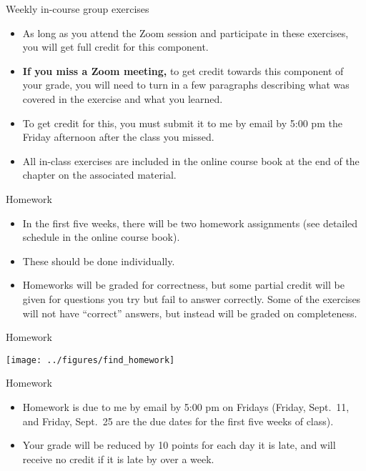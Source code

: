 \documentclass[
  10pt,
  ignorenonframetext,
]{beamer}
\providecommand{\tightlist}{%
  \setlength{\itemsep}{0pt}\setlength{\parskip}{0pt}}
\begin{document}
\begin{frame}{Weekly in-course group exercises}
\protect\hypertarget{weekly-in-course-group-exercises}{}

\begin{itemize}
\tightlist
\item
  As long as you attend the Zoom session and participate in these
  exercises, you will get full credit for this component.
\item
  \textbf{If you miss a Zoom meeting,} to get credit towards this
  component of your grade, you will need to turn in a few paragraphs
  describing what was covered in the exercise and what you learned.
\item
  To get credit for this, you must submit it to me by email by 5:00 pm
  the Friday afternoon after the class you missed.
\item
  All in-class exercises are included in the online course book at the
  end of the chapter on the associated material.
\end{itemize}

\end{frame}

\begin{frame}{Homework}
\protect\hypertarget{homework}{}

\begin{itemize}
\tightlist
\item
  In the first five weeks, there will be two homework assignments (see
  detailed schedule in the online course book).
\item
  These should be done individually.
\item
  Homeworks will be graded for correctness, but some partial credit will
  be given for questions you try but fail to answer correctly. Some of
  the exercises will not have ``correct'' answers, but instead will be
  graded on completeness.
\end{itemize}

\end{frame}

\begin{frame}{Homework}
\protect\hypertarget{homework-1}{}

\begin{center}\texttt{[image: ../figures/find\_homework]} \end{center}

\end{frame}

\begin{frame}{Homework}
\protect\hypertarget{homework-2}{}

\begin{itemize}
\tightlist
\item
  Homework is due to me by email by 5:00 pm on Fridays (Friday,
  Sept.~11, and Friday, Sept.~25 are the due dates for the first five
  weeks of class).
\item
  Your grade will be reduced by 10 points for each day it is late, and
  will receive no credit if it is late by over a week.
\end{itemize}

\end{frame}
\end{document}
